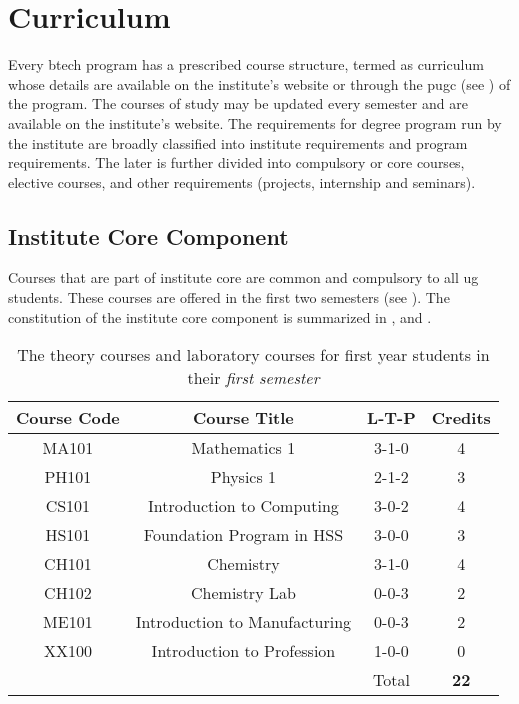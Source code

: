 \section{Curriculum \label{lab:Curriculum}}

Every \acrshort{btech} program has a prescribed course structure, termed as curriculum whose details are available on the \gls{institute}'s website or through the \acrshort{pugc} (see ) of the \gls{program}. The courses of study may be updated every semester and are available on the \gls{institute}'s website. The requirements for degree program run by the \gls{institute} are broadly classified into institute requirements and program requirements. The later is further divided into compulsory or core courses, elective courses, and other requirements (projects, internship and seminars). 

\subsection{Institute Core Component}

Courses that are part of institute core are common and compulsory to all \acrshort{ug} \glspl{student}. These courses are offered in the first two semesters (see ). The constitution of the institute core component is summarized in ,  and .

\begin{table}[b!]
    \centering
    \begin{tabular}{c c c c}
        \toprule
        \textbf{Course Code} &  \textbf{Course Title} & \textbf{L-T-P} & \textbf{Credits} \\
        \midrule
        MA101   & Mathematics 1                 & 3-1-0 & 4 \\
        PH101   & Physics 1                     & 2-1-2 & 3 \\
        CS101   & Introduction to Computing     & 3-0-2 & 4 \\
        HS101   & Foundation Program in HSS     & 3-0-0 & 3 \\
        CH101   & Chemistry                     & 3-1-0 & 4 \\
        CH102   & Chemistry Lab                 & 0-0-3 & 2 \\
        ME101   & Introduction to Manufacturing & 0-0-3 & 2 \\
        XX100   & Introduction to Profession    & 1-0-0 & 0 \\
        \midrule
        {}      & {}                            & Total & \textbf{22} \\
        \bottomrule
    \end{tabular}
    
    \caption{The theory courses and laboratory courses for first year \glspl{student} in their \textit{first semester}}
    \label{tab:first semester courses}
    
\end{table}

